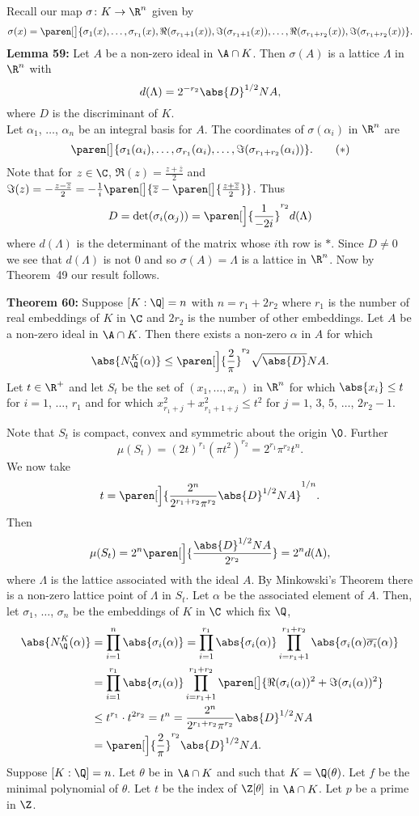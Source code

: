 Recall our map $\sigma\colon K\to\R^n$ given by
\[ \sigma(x) = \paren[\big]{\sigma_1(x),\dotsc,\sigma_{r_1}(x),\Re(\sigma_{r_1+1}(x)),\Im(\sigma_{r_1+1}(x)),\dotsc,\Re(\sigma_{r_1+r_2}(x)),\Im(\sigma_{r_1+r_2}(x))} . \]
\textbf{Lemma 59:} Let $A$ be a non-zero ideal in $\A\cap K$.  Then $\sigma(A)$ is a lattice $\Lambda$ in $\R^n$ with
\[ d(\Lambda) = 2^{-r_2}\abs{D}^{1/2} NA , \]
where $D$ is the discriminant of $K$. \\
\pf Let $\alpha_1$, $\dotsc$, $\alpha_n$ be an integral basis for $A$.  The coordinates of $\sigma(\alpha_i)$ in $\R^n$ are
\[ \paren[\big]{\sigma_1(\alpha_i),\dotsc,\sigma_{r_1}(\alpha_i),\dotsc,\Im(\sigma_{r_1+r_2}(\alpha_i))} . \tag{$*$} \]
Note that for $z\in\C$, $\Re(z)=\frac{z+\overline{z}}{2}$ and $\Im(z)=-\frac{z-\overline{z}}{2}=-\frac{1}{i}\paren[\big]{\overline{z}-\paren[\big]{\frac{z+\overline{z}}{2}}}$.  Thus
\[ D = \det(\sigma_i(\alpha_j)) = \paren[\Big]{\frac{1}{-2i}}^{r_2} d(\Lambda) \]
where $d(\Lambda)$ is the determinant of the matrix whose $i$th row is $*$.  Since $D\neq0$ we see that $d(\Lambda)$ is not $0$ and so $\sigma(A)=\Lambda$ is a lattice in $\R^n$.  Now by Theorem~49 our result follows.

\textbf{Theorem 60:} Suppose $[K:\Q]=n$ with $n=r_1+2r_2$ where $r_1$ is the number of real embeddings of $K$ in $\C$ and $2r_2$ is the number of other embeddings.  Let $A$ be a non-zero ideal in $\A\cap K$.  Then there exists a non-zero $\alpha$ in $A$ for which
\[ \abs{N_\Q^K(\alpha)} \leq \paren[\Big]{\frac{2}{\pi}}^{r_2} \sqrt{\abs{D}} NA . \]
\pf Let $t\in\R^+$ and let $S_t$ be the set of $(x_1,\dotsc,x_n)$ in $\R^n$ for which $\abs{x_i}\leq t$ for $i=1$, $\dotsc$, $r_1$ and for which $x_{r_1+j}^2+x_{r_1+1+j}^2\leq t^2$ for $j=1$, $3$, $5$, $\dotsc$, $2r_2-1$.

Note that $S_t$ is compact, convex and symmetric about the origin $\0$.  Further
\[ \mu(S_t) = (2t)^{r_1}(\pi t^2)^{r_2} = 2^{r_1} \pi^{r_2} t^n . \]
We now take
\[ t = \paren[\Big]{\frac{2^n}{2^{r_1+r_2}\pi^{r_2}}\abs{D}^{1/2}NA}^{1/n} . \]
Then
\[ \mu(S_t) = 2^n\paren[\Big]{\frac{\abs{D}^{1/2}NA}{2^{r_2}}} = 2^n d(\Lambda) , \]
where $\Lambda$ is the lattice associated with the ideal $A$.  By Minkowski's Theorem there is a non-zero lattice point of $\Lambda$ in $S_t$.  Let $\alpha$ be the associated element of $A$.  Then, let $\sigma_1$, $\dotsc$, $\sigma_n$ be the embeddings of $K$ in $\C$ which fix $\Q$,
\begin{align*}
\abs{N_\Q^K(\alpha)} &= \prod_{i=1}^n \abs{\sigma_i(\alpha)} = \prod_{i=1}^{r_1} \abs{\sigma_i(\alpha)} \prod_{i=r_1+1}^{r_1+r_2}\abs{\sigma_i(\alpha)\overline{\sigma_i}(\alpha)} \\
&= \prod_{i=1}^{r_1}\abs{\sigma_i(\alpha)}\prod_{i=r_1+1}^{r_1+r_2}\paren[\big]{\Re(\sigma_i(\alpha))^2+\Im(\sigma_i(\alpha))^2} \\
&\leq t^{r_1}\cdot t^{2r_2} = t^n = \frac{2^n}{2^{r_1+r_2}\pi^{r_2}}\abs{D}^{1/2}NA \\
&= \paren[\Big]{\frac{2}{\pi}}^{r_2} \abs{D}^{1/2} NA .
\end{align*}
Suppose $[K:\Q]=n$.  Let $\theta$ be in $\A\cap K$ and such that $K=\Q(\theta)$.  Let $f$ be the minimal polynomial of $\theta$.  Let $t$ be the index of $\Z[\theta]$ in $\A\cap K$.  Let $p$ be a prime in $\Z$.

